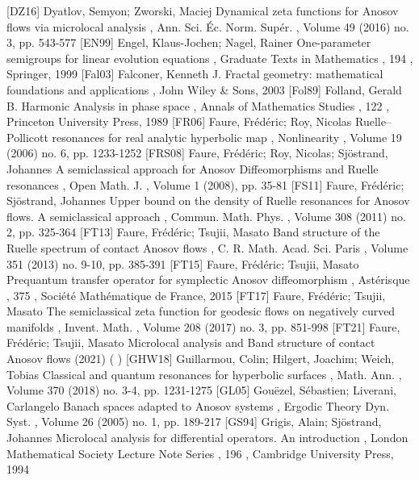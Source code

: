  [DZ16] Dyatlov, Semyon; Zworski, Maciej Dynamical zeta functions for Anosov flows via microlocal analysis , Ann. Sci. Éc. Norm. Supér. , Volume 49 (2016) no. 3, pp. 543-577
 [EN99] Engel, Klaus-Jochen; Nagel, Rainer One-parameter semigroups for linear evolution equations , Graduate Texts in Mathematics , 194 , Springer, 1999
 [Fal03] Falconer, Kenneth J. Fractal geometry: mathematical foundations and applications , John Wiley \& Sons, 2003
 [Fol89] Folland, Gerald B. Harmonic Analysis in phase space , Annals of Mathematics Studies , 122 , Princeton University Press, 1989
 [FR06] Faure, Frédéric; Roy, Nicolas Ruelle–Pollicott resonances for real analytic hyperbolic map , Nonlinearity , Volume 19 (2006) no. 6, pp. 1233-1252
 [FRS08] Faure, Frédéric; Roy, Nicolas; Sjöstrand, Johannes A semiclassical approach for Anosov Diffeomorphisms and Ruelle resonances , Open Math. J. , Volume 1 (2008), pp. 35-81
 [FS11] Faure, Frédéric; Sjöstrand, Johannes Upper bound on the density of Ruelle resonances for Anosov flows. A semiclassical approach , Commun. Math. Phys. , Volume 308 (2011) no. 2, pp. 325-364
 [FT13] Faure, Frédéric; Tsujii, Masato Band structure of the Ruelle spectrum of contact Anosov flows , C. R. Math. Acad. Sci. Paris , Volume 351 (2013) no. 9-10, pp. 385-391
 [FT15] Faure, Frédéric; Tsujii, Masato Prequantum transfer operator for symplectic Anosov diffeomorphism , Astérisque , 375 , Société Mathématique de France, 2015
 [FT17] Faure, Frédéric; Tsujii, Masato The semiclassical zeta function for geodesic flows on negatively curved manifolds , Invent. Math. , Volume 208 (2017) no. 3, pp. 851-998
 [FT21] Faure, Frédéric; Tsujii, Masato Microlocal analysis and Band structure of contact Anosov flows (2021) ( )
 [GHW18] Guillarmou, Colin; Hilgert, Joachim; Weich, Tobias Classical and quantum resonances for hyperbolic surfaces , Math. Ann. , Volume 370 (2018) no. 3-4, pp. 1231-1275
 [GL05] Gouëzel, Sébastien; Liverani, Carlangelo Banach spaces adapted to Anosov systems , Ergodic Theory Dyn. Syst. , Volume 26 (2005) no. 1, pp. 189-217
 [GS94] Grigis, Alain; Sjöstrand, Johannes Microlocal analysis for differential operators. An introduction , London Mathematical Society Lecture Note Series , 196 , Cambridge University Press, 1994
